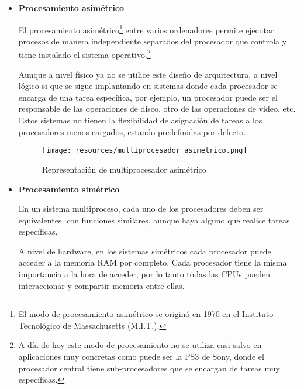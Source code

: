 \documentclass[a4paper, 11pt, titlepage]{article}
\begin{document}
        \begin{itemize}
            \item \textbf{Procesamiento asimétrico}
            
            El procesamiento asimétrico\footnote{
                El modo de procesamiento asimétrico se originó en 1970 en el Instituto
                 Tecnológico de Massachusetts (M.I.T.). 
            } entre varios ordenadores permite ejecutar procesos 
            de manera independiente separados del procesador que controla y tiene instalado
            el sistema operativo.\footnote{
                A día de hoy este modo de procesamiento no se utiliza casi salvo en 
                aplicaciones muy concretas como puede ser la PS3 de Sony, donde el 
                procesador central tiene sub-procesadores que se encargan de tareas 
                muy específicas.
            }

            Aunque a nivel físico ya no se utilice este diseño de arquitectura, a nivel 
            lógico si que se sigue implantando en sistemas donde cada procesador se encarga
            de una tarea específica, por ejemplo, un procesador puede ser el responsable
            de las operaciones de disco, otro de las operaciones de video, etc. Estos
            sistemas no tienen la flexibilidad de asignación de tareas a los procesadores 
            menos cargados, estando predefinidas por defecto.

            \begin{figure}[htp]
                \centering
                \texttt{[image: resources/multiprocesador\_asimetrico.png]}
                \caption{Representación de multiprocesador asimétrico}
                \label{multiprocesador_asimetrico}
            \end{figure}

            \item \textbf{Procesamiento simétrico}
            
            En un sistema multiproceso, cada uno de los procesadores deben ser equivalentes,
            con funciones similares, aunque haya alguno que realice tareas específicas.

            A nivel de hardware, en los sistemas simétricos cada procesador puede acceder a 
            la memoria RAM por completo. Cada procesador tiene la misma importancia a la hora
            de acceder, por lo tanto todas las CPUs pueden interaccionar y compartir memoria 
            entre ellas.
            

\end{itemize}
\end{document}
